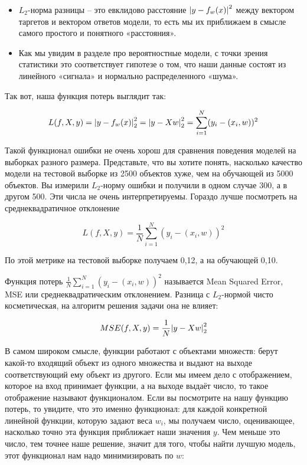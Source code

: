 \begin{itemize}

    \item $L_2$-норма разницы -- это евклидово расстояние $\abs{y - f_w(x)}^2$ между вектором таргетов и
    вектором ответов модели, то есть мы их приближаем в смысле самого простого и понятного «расстояния».

    \item Как мы увидим в разделе про вероятностные модели, с точки зрения статистики это соответствует гипотезе
    о том, что наши данные состоят из линейного «сигнала» и нормально распределенного «шума».

\end{itemize}

Так вот, наша функция потерь выглядит так:

\[ L(f,X,y) = \abs{y - f_w(x)}^2_2 = \abs{y - X w}^2_2 = \sum_{i=1}^N (y_i - (x_i,w))^2 \]

Такой функционал ошибки не очень хорош для сравнения поведения моделей на выборках разного размера.
Представьте, что вы хотите понять, насколько качество модели на тестовой выборке из 2500 объектов хуже, чем на
обучающей из 5000 объектов.
Вы измерили $L_2$-норму ошибки и получили в одном случае 300, а в другом 500.
Эти числа не очень интерпретируемы.
Гораздо лучше посмотреть на среднеквадратичное отклонение

\[ L(f,X,y) = \frac{1}{N} \sum_{i=1}^N (y_i - (x_i,w))^2 \]

По этой метрике на тестовой выборке получаем 0,12, а на обучающей 0,10.

Функция потерь $\frac{1}{N} \sum_{i=1}^N (y_i - (x_i,w))^2$ называется Mean Squared Error, MSE или
среднеквадратическим отклонением.
Разница с $L_2$-нормой чисто косметическая, на алгоритм решения задачи она не влияет:

\[ MSE(f,X,y) = \frac{1}{N} \abs{y - X w}^2_2 \]

В самом широком смысле, функции работают с объектами множеств: берут какой-то входящий объект из одного множества и
выдают на выходе соответствующий ему объект из другого.
Если мы имеем дело с отображением, которое на вход принимает функции, а на выходе выдаёт число, то такое отображение
называют функционалом.
Если вы посмотрите на нашу функцию потерь, то увидите, что это именно функционал: для каждой конкретной линейной
функции, которую задают веса $w_i$, мы получаем число, оценивающее, насколько точно эта функция приближает наши
значения $y$.
Чем меньше это число, тем точнее наше решение, значит для того, чтобы найти лучшую модель, этот функционал нам надо
минимизировать по $w$:

